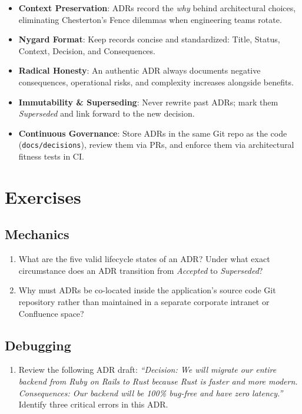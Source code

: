 \begin{itemize}[leftmargin=18pt]
  \item \textbf{Context Preservation}: ADRs record the \textit{why} behind architectural choices, eliminating Chesterton's Fence dilemmas when engineering teams rotate.
  \item \textbf{Nygard Format}: Keep records concise and standardized: Title, Status, Context, Decision, and Consequences.
  \item \textbf{Radical Honesty}: An authentic ADR always documents negative consequences, operational risks, and complexity increases alongside benefits.
  \item \textbf{Immutability \& Superseding}: Never rewrite past ADRs; mark them \textit{Superseded} and link forward to the new decision.
  \item \textbf{Continuous Governance}: Store ADRs in the same Git repo as the code (\texttt{docs/decisions}), review them via PRs, and enforce them via architectural fitness tests in CI.
\end{itemize}

\section{Exercises}

\subsection*{Mechanics}
\begin{enumerate}[leftmargin=18pt]
  \item What are the five valid lifecycle states of an ADR? Under what exact circumstance does an ADR transition from \textit{Accepted} to \textit{Superseded}?
  \item Why must ADRs be co-located inside the application's source code Git repository rather than maintained in a separate corporate intranet or Confluence space?
\end{enumerate}

\subsection*{Debugging}
\begin{enumerate}[leftmargin=18pt]
  \item Review the following ADR draft: \textit{``Decision: We will migrate our entire backend from Ruby on Rails to Rust because Rust is faster and more modern. Consequences: Our backend will be 100\% bug-free and have zero latency.''} Identify three critical errors in this ADR.
\end{enumerate}

